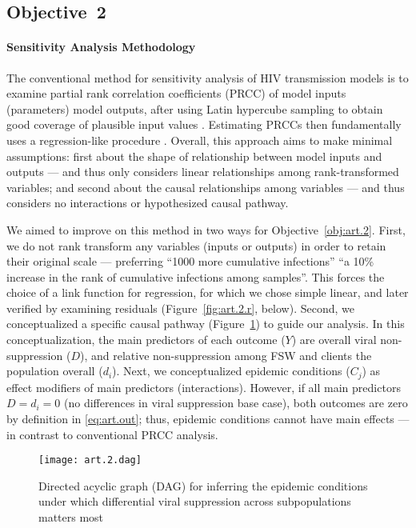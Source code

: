 \subsection{Objective~2}\label{sr.art.2}
\paragraph{Sensitivity Analysis Methodology}
The conventional method for sensitivity analysis of HIV transmission models is to
examine partial rank correlation coefficients (PRCC) of model inputs (parameters) \vs model outputs,
after using Latin hypercube sampling to obtain good coverage of plausible input values
\cite{Blower1994,Marino2008,Johnson2016cc}.
Estimating PRCCs then fundamentally uses a regression-like procedure \cite{Kim2015}.
Overall, this approach aims to make minimal assumptions:
first about the shape of relationship between model inputs and outputs
--- and thus only considers linear relationships among rank-transformed variables; and
second about the causal relationships among variables
--- and thus considers no interactions or hypothesized causal pathway.
\par
We aimed to improve on this method in two ways for Objective~\ref{obj:art.2}.
First, we do not rank transform any variables (inputs or outputs)
in order to retain their original scale --- \eg preferring
``1000 more cumulative infections'' \vs
``a 10\% increase in the rank of cumulative infections among samples''.
This forces the choice of a link function for regression,
for which we chose simple linear,
and later verified by examining residuals (Figure~\ref{fig:art.2.r}, below).
Second, we conceptualized a specific causal pathway
(Figure~\ref{fig:art.2.dag}) to guide our analysis.
In this conceptualization, the main predictors of each outcome ($Y$) are
overall viral non-suppression ($D$), and
relative non-suppression among FSW and clients \vs the population overall ($d_i$).
Next, we conceptualized epidemic conditions ($C_j$) as
effect modifiers of main predictors (interactions).
However, if all main predictors $D = d_i = 0$
(no differences in viral suppression \vs base case),
both outcomes are zero by definition in \eqref{eq:art.out};
thus, epidemic conditions cannot have main effects
--- in contrast to conventional PRCC analysis.
\begin{figure}[b]
  \centering\texttt{[image: art.2.dag]}
  \caption{Directed acyclic graph (DAG) for inferring
    the epidemic conditions under which
    differential viral suppression across subpopulations matters most}
  \label{fig:art.2.dag}
\end{figure}

